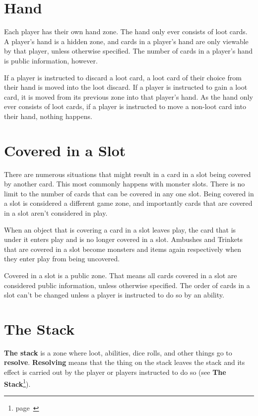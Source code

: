\documentclass[
  fontsize=10pt,
  paper=a5,
  version=last,
  chapterprefix=true,
  bindingoffset=5mm,
  ]{scrbook}
\begin{document}
    \section{Hand}
    Each player has their own hand zone. The hand only ever consists of loot cards. A player’s hand is a hidden zone, and cards in a player’s hand are only viewable by that player, unless otherwise specified. The number of cards in a player’s hand is public information, however.

    If a player is instructed to discard a loot card, a loot card of their choice from their hand is moved into the loot discard. If a player is instructed to gain a loot card, it is moved from its previous zone into that player’s hand. As the hand only ever consists of loot cards, if a player is instructed to move a non-loot card into their hand, nothing happens.

    \section{Covered in a Slot}
    There are numerous situations that might result in a card in a slot being covered by another card. This most commonly happens with monster slots. There is no limit to the number of cards that can be covered in any one slot. Being covered in a slot is considered a different game zone, and importantly cards that are covered in a slot aren’t considered in play.

    When an object that is covering a card in a slot leaves play, the card that is under it enters play and is no longer covered in a slot. Ambushes and Trinkets that are covered in a slot become monsters and items again respectively when they enter play from being uncovered.

    Covered in a slot is a public zone. That means all cards covered in a slot are considered public information, unless otherwise specified. The order of cards in a slot can’t be changed unless a player is instructed to do so by an ability.

    \section{The Stack}
    \textbf{The stack} is a zone where loot, abilities, dice rolls, and other things go to \textbf{resolve}. \textbf{Resolving} means that the thing on the stack leaves the stack and its effect is carried out by the player or players instructed to do so (see \textbf{The Stack}\footnote{page~\pageref{stack}}).
\end{document}
